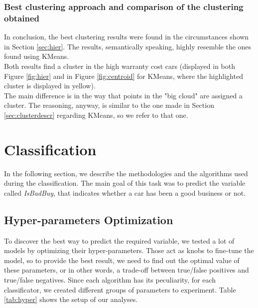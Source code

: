 \documentclass{article}
\begin{document}
	
	\subsubsection{Best clustering approach and comparison of the clustering obtained}
	In conclusion, the best clustering results were found in the circumstances shown in Section \ref{sec:hier}. The results, semantically speaking, highly resemble the ones found using KMeans.\\ Both results find a cluster in the high warranty cost cars (displayed in both Figure \ref{fig:hier} and in Figure \ref{fig:centroid} for KMeans, where the highlighted cluster is displayed in yellow).\\
	The main difference is in the way that points in the "big cloud" are assigned a cluster. The reasoning, anyway, is similar to the one made in Section \ref{sec:clusterdescr} regarding KMeans, so we refer to that one.
	
	
	
	\newpage
	\section{Classification}
	\label{sec:classification}
	In the following section, we describe the methodologies and the algorithms used during the classification. The main goal of this task was to predict the variable called \textit{IsBadBuy}, that indicates whether a car has been a good business or not.
	
	\subsection{Hyper-parameters Optimization}
	To discover the best way to predict the required variable, we tested a lot of models by optimizing their hyper-parameters. Those act as knobs to fine-tune the model, so to provide the best result, we need to find out the optimal value of these parameters, or in other words, a trade-off between true/false positives and true/false negatives. Since each algorithm has its peculiarity, for each classificator, we created different groups of parameters to experiment. Table \ref{tab:hyper} shows the setup of our analyses.
	
\end{document}
